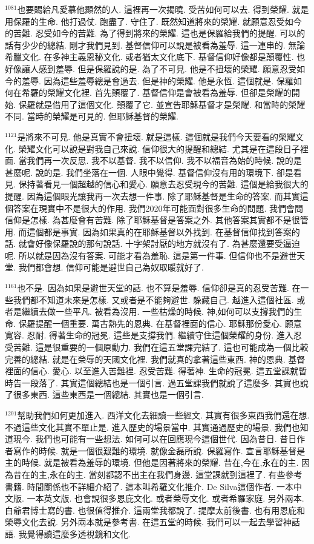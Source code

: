 \documentclass{book}
\begin{document}
$^{1081}$也要賜給凡愛慕他顯然的人.
這裡再一次揭曉.
受苦如何可以去.
得到榮耀.
就是用保羅的生命.
他打過仗.
跑盡了.
守住了.
既然知道將來的榮耀.
就願意忍受如今的苦難.
忍受如今的苦難.
為了得到將來的榮耀.
這也是保羅給我們的提醒.
可以的話有少少的總結.
剛才我們見到.
基督信仰可以說是被看為羞辱.
這一連串的.
無論希臘文化.
在多神主義恩秘文化.
或者猶太文化底下.
基督信仰好像都是顛覆性.
也好像讓人感到羞辱.
但是保羅說的是.
為了不可見.
他是不扭壞的榮耀.
願意忍受如今的羞辱.
因為這些羞辱總是會過去.
但是神的榮耀.
他是永恆.
這個就是.
保羅如何在希羅的榮耀文化裡.
首先顛覆了.
基督信仰是會被看為羞辱.
但卻是榮耀的開始.
保羅就是借用了這個文化.
顛覆了它.
並宣告耶穌基督才是榮耀.
和當時的榮耀不同.
當時的榮耀是可見的.
但耶穌基督的榮耀.

$^{1121}$是將來不可見.
他是真實不會扭壞.
就是這樣.
這個就是我們今天要看的榮耀文化.
榮耀文化可以說是對我自己來說.
信仰很大的提醒和總結.
尤其是在這段日子裡面.
當我們再一次反思.
我不以基督.
我不以信仰.
我不以福音為始的時候.
說的是甚麼呢.
說的是.
我們坐落在一個.
人眼中覺得.
基督信仰沒有用的環境下.
卻是看見.
保持著看見一個超越的信心和愛心.
願意去忍受現今的苦難.
這個是給我很大的提醒.
因為這個眼光讓我再一次去想一件事.
除了耶穌基督是生命的答案.
而其實這個答案在現實中不是很大的作用.
我們2020年可能面對很多生命的問題.
我們會問信仰是怎樣.
為甚麼會有苦難.
除了耶穌基督是答案之外.
其他答案其實都不是很管用.
而這個都是事實.
因為如果真的在耶穌基督以外找到.
在基督信仰找到答案的話.
就會好像保羅說的那句說話.
十字架討厭的地方就沒有了.
為甚麼還要受逼迫呢.
所以就是因為沒有答案.
可能才看為羞恥.
這是第一件事.
但信仰也不是避世天堂.
我們都會想.
信仰可能是避世自己為奴取暖就好了.

$^{1161}$也不是.
因為如果是避世天堂的話.
也不算是羞辱.
信仰卻是真的忍受苦難.
在一些我們都不知道未來是怎樣.
又或者是不能夠避世.
躲藏自己.
越進入這個社區.
或者是繼續去做一些平凡.
被看為沒用.
一些枯燥的時候.
神,如何可以支撐我們的生命.
保羅提醒一個重要.
萬古熱先的恩典.
在基督裡面的信心.
耶穌那份愛心.
願意寬容.
忍耐.
得著生命的冠冕.
這些是支撐我們.
繼續守住這個榮耀的身份.
進入忍受苦難.
這是很重要的一個原動力.
我們在這五堂課完結了.
這也可能成為一個比較完善的總結.
就是在榮辱的天國文化裡.
我們就真的拿著這些東西.
神的恩典.
基督裡面的信心.
愛心.
以至進入苦難裡.
忍受苦難.
得著神.
生命的冠冕.
這五堂課就暫時告一段落了.
其實這個總結也是一個引言.
過五堂課我們就說了這麼多.
其實也說了很多東西.
這些東西是一個總結.
其實也是一個引言.

$^{1201}$幫助我們如何更加進入.
西洋文化去細讀一些經文.
其實有很多東西我們還在想.
不過這些文化其實不單止是.
進入歷史的場景當中.
其實通過歷史的場景.
我們也知道現今.
我們也可能有一些想法.
如何可以在回應現今這個世代.
因為昔日.
昔日作者寫作的時候.
就是一個很艱難的環境.
就像金磊所說.
保羅寫作.
宣言耶穌基督是主的時候.
就是被看為羞辱的環境.
但他是因著將來的榮耀.
昔在,今在,永在的主.
因為昔在的主,永在的主.
當刻都認不出主在我們身邊.
這堂課就到這裡了.
有些參考書籍.
時間關係也不詳細介紹了.
這本叫希羅文化推介.
De Silva這個作者.
一本中文版.
一本英文版.
也會說很多恩庇文化.
或者榮辱文化.
或者希羅家庭.
另外兩本.
白爺君博士寫的書.
也很值得推介.
這兩堂我都說了.
提摩太前後書.
也有用恩庇和榮辱文化去說.
另外兩本就是參考書.
在這五堂的時候.
我們可以一起去學習神話語.
我覺得讀這麼多透視鏡和文化.
\end{document}
